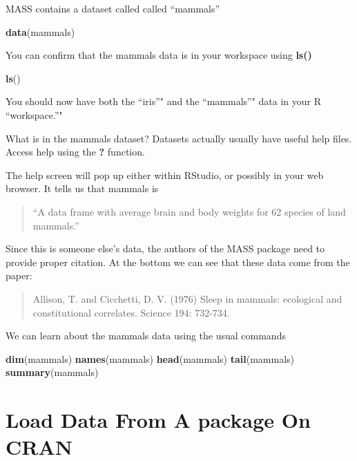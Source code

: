 \documentclass[]{book}
\newenvironment{Shaded}{\begin{snugshade}}{\end{snugshade}}
\newcommand{\KeywordTok}[1]{\textcolor[rgb]{0.13,0.29,0.53}{\textbf{#1}}}
\newcommand{\NormalTok}[1]{#1}
\theoremstyle{definition}
\theoremstyle{definition}
\theoremstyle{definition}
\theoremstyle{remark}
\begin{document}
MASS contains a dataset called called ``mammals''

\begin{Shaded}
\begin{Highlighting}[]
\KeywordTok{data}\NormalTok{(mammals)}
\end{Highlighting}
\end{Shaded}

You can confirm that the mammals data is in your workspace using
\textbf{ls()}

\begin{Shaded}
\begin{Highlighting}[]
\KeywordTok{ls}\NormalTok{()}
\end{Highlighting}
\end{Shaded}

You should now have both the ``iris''" and the ``mammals''" data in your
R ``workspace.''"

What is in the mammals dataset? Datasets actually usually have useful
help files. Access help using the \textbf{?} function.

The help screen will pop up either within RStudio, or possibly in your
web browser. It tells us that mammals is

\begin{quote}
``A data frame with average brain and body weights for 62 species of
land mammals.''
\end{quote}

Since this is someone else's data, the authors of the MASS package need
to provide proper citation. At the bottom we can see that these data
come from the paper:

\begin{quote}
Allison, T. and Cicchetti, D. V. (1976) Sleep in mammals: ecological and
constitutional correlates. Science 194: 732-734.
\end{quote}

We can learn about the mammals data using the usual commands

\begin{Shaded}
\begin{Highlighting}[]
\KeywordTok{dim}\NormalTok{(mammals)}
\KeywordTok{names}\NormalTok{(mammals)}
\KeywordTok{head}\NormalTok{(mammals)}
\KeywordTok{tail}\NormalTok{(mammals)}
\KeywordTok{summary}\NormalTok{(mammals)}
\end{Highlighting}
\end{Shaded}

\section{Load Data From A package On
CRAN}\label{load-data-from-a-package-on-cran}
\end{document}
